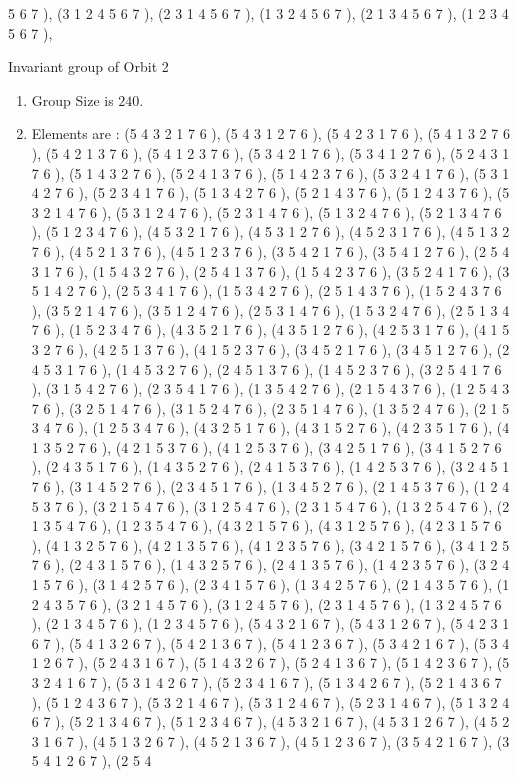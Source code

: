 \documentclass[12pt]{article}
\begin{document}
\begin{enumerate}
5 6 7  ), (3 1 2 4 5 6 7  ), (2 3 1 4 5 6 7  ), (1 3 2 4 5 6 7  ), (2 1 3 4 5 6 7  ), (1 2 3 4 5 6 7  ), 
\end{enumerate}
Invariant group of Orbit 2
\begin{enumerate}
\item Group Size is $240$.
\item Elements are : (5 4 3 2 1 7 6  ), (5 4 3 1 2 7 6  ), (5 4 2 3 1 7 6  ), (5 4 1 3 2 7 6  ), (5 4 2 1 3 7 6  ), (5 4 1 2 3 7 6  ), (5 3 4 2 1 7 6  ), (5 3 4 1 2 7 6  ), (5 2 4 3 1 7 6  ), (5 1 4 3 2 7 6  ), (5 2 4 1 3 7 6  ), (5 1 4 2 3 7 6  ), (5 3 2 4 1 7 6  ), (5 3 1 4 2 7 6  ), (5 2 3 4 1 7 6  ), (5 1 3 4 2 7 6  ), (5 2 1 4 3 7 6  ), (5 1 2 4 3 7 6  ), (5 3 2 1 4 7 6  ), (5 3 1 2 4 7 6  ), (5 2 3 1 4 7 6  ), (5 1 3 2 4 7 6  ), (5 2 1 3 4 7 6  ), (5 1 2 3 4 7 6  ), (4 5 3 2 1 7 6  ), (4 5 3 1 2 7 6  ), (4 5 2 3 1 7 6  ), (4 5 1 3 2 7 6  ), (4 5 2 1 3 7 6  ), (4 5 1 2 3 7 6  ), (3 5 4 2 1 7 6  ), (3 5 4 1 2 7 6  ), (2 5 4 3 1 7 6  ), (1 5 4 3 2 7 6  ), (2 5 4 1 3 7 6  ), (1 5 4 2 3 7 6  ), (3 5 2 4 1 7 6  ), (3 5 1 4 2 7 6  ), (2 5 3 4 1 7 6  ), (1 5 3 4 2 7 6  ), (2 5 1 4 3 7 6  ), (1 5 2 4 3 7 6  ), (3 5 2 1 4 7 6  ), (3 5 1 2 4 7 6  ), (2 5 3 1 4 7 6  ), (1 5 3 2 4 7 6  ), (2 5 1 3 4 7 6  ), (1 5 2 3 4 7 6  ), (4 3 5 2 1 7 6  ), (4 3 5 1 2 7 6  ), (4 2 5 3 1 7 6  ), (4 1 5 3 2 7 6  ), (4 2 5 1 3 7 6  ), (4 1 5 2 3 7 6  ), (3 4 5 2 1 7 6  ), (3 4 5 1 2 7 6  ), (2 4 5 3 1 7 6  ), (1 4 5 3 2 7 6  ), (2 4 5 1 3 7 6  ), (1 4 5 2 3 7 6  ), (3 2 5 4 1 7 6  ), (3 1 5 4 2 7 6  ), (2 3 5 4 1 7 6  ), (1 3 5 4 2 7 6  ), (2 1 5 4 3 7 6  ), (1 2 5 4 3 7 6  ), (3 2 5 1 4 7 6  ), (3 1 5 2 4 7 6  ), (2 3 5 1 4 7 6  ), (1 3 5 2 4 7 6  ), (2 1 5 3 4 7 6  ), (1 2 5 3 4 7 6  ), (4 3 2 5 1 7 6  ), (4 3 1 5 2 7 6  ), (4 2 3 5 1 7 6  ), (4 1 3 5 2 7 6  ), (4 2 1 5 3 7 6  ), (4 1 2 5 3 7 6  ), (3 4 2 5 1 7 6  ), (3 4 1 5 2 7 6  ), (2 4 3 5 1 7 6  ), (1 4 3 5 2 7 6  ), (2 4 1 5 3 7 6  ), (1 4 2 5 3 7 6  ), (3 2 4 5 1 7 6  ), (3 1 4 5 2 7 6  ), (2 3 4 5 1 7 6  ), (1 3 4 5 2 7 6  ), (2 1 4 5 3 7 6  ), (1 2 4 5 3 7 6  ), (3 2 1 5 4 7 6  ), (3 1 2 5 4 7 6  ), (2 3 1 5 4 7 6  ), (1 3 2 5 4 7 6  ), (2 1 3 5 4 7 6  ), (1 2 3 5 4 7 6  ), (4 3 2 1 5 7 6  ), (4 3 1 2 5 7 6  ), (4 2 3 1 5 7 6  ), (4 1 3 2 5 7 6  ), (4 2 1 3 5 7 6  ), (4 1 2 3 5 7 6  ), (3 4 2 1 5 7 6  ), (3 4 1 2 5 7 6  ), (2 4 3 1 5 7 6  ), (1 4 3 2 5 7 6  ), (2 4 1 3 5 7 6  ), (1 4 2 3 5 7 6  ), (3 2 4 1 5 7 6  ), (3 1 4 2 5 7 6  ), (2 3 4 1 5 7 6  ), (1 3 4 2 5 7 6  ), (2 1 4 3 5 7 6  ), (1 2 4 3 5 7 6  ), (3 2 1 4 5 7 6  ), (3 1 2 4 5 7 6  ), (2 3 1 4 5 7 6  ), (1 3 2 4 5 7 6  ), (2 1 3 4 5 7 6  ), (1 2 3 4 5 7 6  ), (5 4 3 2 1 6 7  ), (5 4 3 1 2 6 7  ), (5 4 2 3 1 6 7  ), (5 4 1 3 2 6 7  ), (5 4 2 1 3 6 7  ), (5 4 1 2 3 6 7  ), (5 3 4 2 1 6 7  ), (5 3 4 1 2 6 7  ), (5 2 4 3 1 6 7  ), (5 1 4 3 2 6 7  ), (5 2 4 1 3 6 7  ), (5 1 4 2 3 6 7  ), (5 3 2 4 1 6 7  ), (5 3 1 4 2 6 7  ), (5 2 3 4 1 6 7  ), (5 1 3 4 2 6 7  ), (5 2 1 4 3 6 7  ), (5 1 2 4 3 6 7  ), (5 3 2 1 4 6 7  ), (5 3 1 2 4 6 7  ), (5 2 3 1 4 6 7  ), (5 1 3 2 4 6 7  ), (5 2 1 3 4 6 7  ), (5 1 2 3 4 6 7  ), (4 5 3 2 1 6 7  ), (4 5 3 1 2 6 7  ), (4 5 2 3 1 6 7  ), (4 5 1 3 2 6 7  ), (4 5 2 1 3 6 7  ), (4 5 1 2 3 6 7  ), (3 5 4 2 1 6 7  ), (3 5 4 1 2 6 7  ), (2 5 4 
\end{enumerate}
\end{document}
